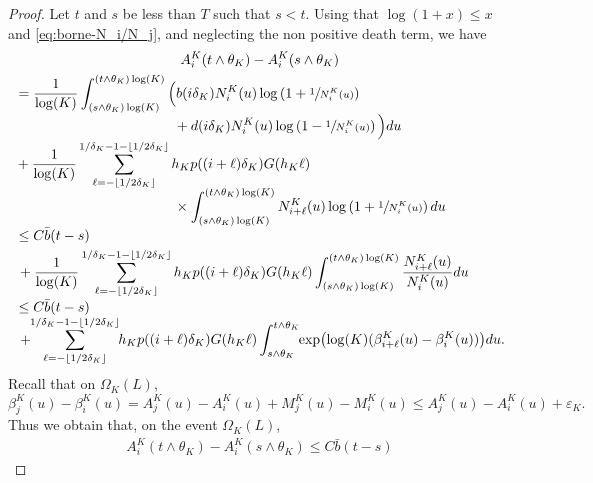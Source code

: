 \documentclass[JEP,XML,SOM,Unicode,published]{cedram}
\theoremstyle{plain}
\theoremstyle{remark}
\begin{document}
\begin{proof}
Let $t$ and $s$ be less than $T$ such that $s<t$. Using that $ \log (1+x)\leq x$ and \eqref{eq:borne-N_i/N_j}, and neglecting the non positive death term, we have\vspace*{-5pt}
\begin{multline*}
A_{i}^K(t\wedge \theta_K) - A_{i}^K(s\wedge \theta_K)\\
\begin{aligned}
&= \frac{1}{\log(K)}\int_{(s\wedge \theta_K) \log(K)}^{(t\wedge \theta_K)\log(K)}\Big(b(i \delta_{K})N^K_{i}(u) \log\left(1+\sfrac{1}{N^K_{i}(u)}\right)\\[-3pt]
&
\hspace{4cm} + d(i \delta_{K})N^K_{i}(u) \log\left(1-\sfrac{1}{N^K_{i}(u)}\right)\Big) du \\[-3pt]
& +\frac{1}{\log(K)} \sum_{\ell=-\lfloor 1/2\delta_K\rfloor}^{1/\delta_K-1-\lfloor 1/2\delta_K\rfloor} h_{K} p((i+\ell) \delta_{K}) G(h_{K}\ell)\\[-5pt]
& \hspace{4cm} \times \int_{(s\wedge \theta_K) \log(K)}^{(t\wedge \theta_K)\log(K)}N^K_{i+\ell}(u)\log\left(1+\sfrac{1}{N^K_{i}(u)}\right) du \\[-3pt]
&\leq C\bar b (t- s) \\
& \, + \frac{1}{\log(K)} \sum_{\ell=-\lfloor 1/2\delta_K\rfloor}^{1/\delta_K-1-\lfloor 1/2\delta_K\rfloor} h_{K} p((i+\ell) \delta_{K}) G(h_{K}\ell)\int_{(s\wedge \theta_K) \log(K)}^{(t\wedge \theta_K)\log(K)}\frac{N^K_{i+\ell}(u)}{N^K_{i}(u)} du\\[-3pt]
&\leq C\bar b (t - s)
\\[-3pt]
& \, +\hspace*{-1mm} \sum_{\ell=-\lfloor 1/2\delta_K\rfloor}^{1/\delta_K-1-\lfloor 1/2\delta_K\rfloor}\hspace*{-1mm} h_{K} p((i+\ell) \delta_{K}) G(h_{K}\ell)\int_{s\wedge \theta_K }^{t\wedge \theta_K}\hspace*{-1mm} \exp\bigl(\log(K) (\beta^K_{i+\ell}(u)-\beta^K_{i}(u))\bigr) du.
\end{aligned}
\end{multline*}
Recall that on $\Omega_K(L)$,\vspace*{-3pt}
\[\beta^K_{j}(u)-\beta^K_{i}(u) =A_{j}^K(u) - A_{i}^K(u)+ M_{j}^K(u) -M_{i}^K(u) \leq A_{j}^K(u) - A_{i}^K(u)+\varepsilon_K
.\]
Thus we obtain that, on the event $\Omega_K(L)$,\vspace*{-5pt}
\begin{multline*} A_{i}^K(t\wedge\theta_K) - A_{i}^K(s\wedge\theta_K)
\leq C\bar b (t - s)

\end{multline*}
\end{proof}
\end{document}
